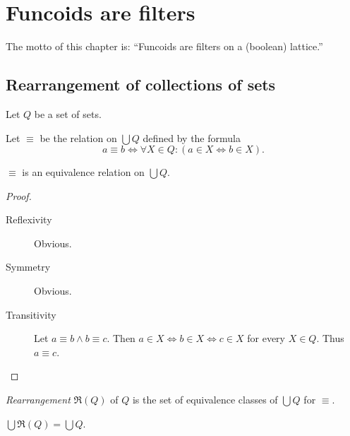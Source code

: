 
\chapter{Funcoids are filters}

The motto of this chapter is: ``Funcoids are filters on a (boolean) lattice.''


\section{Rearrangement of collections of sets}

Let $Q$ be a set of sets.

Let $\equiv$ be the relation on $\bigcup Q$ defined by the formula
\[
a\equiv b\Leftrightarrow\forall X\in Q:(a\in X\Leftrightarrow b\in X).
\]

\begin{prop}
$\equiv$ is an equivalence relation on $\bigcup Q$.\end{prop}
\begin{proof}
~
\begin{description}
\item [{Reflexivity}] Obvious.
\item [{Symmetry}] Obvious.
\item [{Transitivity}] Let $a\equiv b\wedge b\equiv c$. Then $a\in X\Leftrightarrow b\in X\Leftrightarrow c\in X$
for every $X\in Q$. Thus $a\equiv c$.
\end{description}
\end{proof}
\begin{defn}
\emph{Rearrangement} $\mathfrak{R}(Q)$ of $Q$ is the set of equivalence
classes of $\bigcup Q$ for $\equiv$.\end{defn}
\begin{obvious}
$\bigcup\mathfrak{R}(Q)=\bigcup Q$.
\end{obvious}

